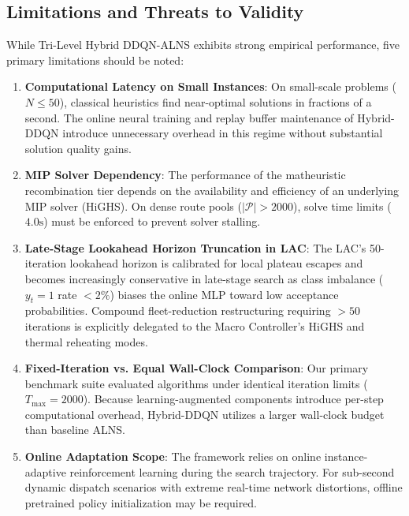 \subsection{Limitations and Threats to Validity}
\label{sec:disc_limitations}

While Tri-Level Hybrid DDQN-ALNS exhibits strong empirical performance, five primary limitations should be noted:
\begin{enumerate}
    \item \textbf{Computational Latency on Small Instances}: On small-scale problems ($N \le 50$), classical heuristics find near-optimal solutions in fractions of a second. The online neural training and replay buffer maintenance of Hybrid-DDQN introduce unnecessary overhead in this regime without substantial solution quality gains.
    \item \textbf{MIP Solver Dependency}: The performance of the matheuristic recombination tier depends on the availability and efficiency of an underlying MIP solver (HiGHS). On dense route pools ($|\mathcal{P}| > 2000$), solve time limits ($4.0\text{s}$) must be enforced to prevent solver stalling.
    \item \textbf{Late-Stage Lookahead Horizon Truncation in LAC}: The LAC's 50-iteration lookahead horizon is calibrated for local plateau escapes and becomes increasingly conservative in late-stage search as class imbalance ($y_t = 1$ rate $< 2\%$) biases the online MLP toward low acceptance probabilities. Compound fleet-reduction restructuring requiring $> 50$ iterations is explicitly delegated to the Macro Controller's HiGHS and thermal reheating modes.
    \item \textbf{Fixed-Iteration vs. Equal Wall-Clock Comparison}: Our primary benchmark suite evaluated algorithms under identical iteration limits ($T_{\max} = 2000$). Because learning-augmented components introduce per-step computational overhead, Hybrid-DDQN utilizes a larger wall-clock budget than baseline ALNS.
    \item \textbf{Online Adaptation Scope}: The framework relies on online instance-adaptive reinforcement learning during the search trajectory. For sub-second dynamic dispatch scenarios with extreme real-time network distortions, offline pretrained policy initialization may be required.
\end{enumerate}
